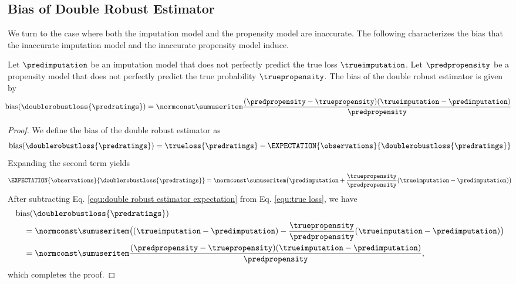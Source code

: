 \subsection{Bias of Double Robust Estimator}
We turn to the case where both the imputation model and the propensity model are inaccurate.
The following characterizes the bias that the inaccurate imputation model and the inaccurate propensity model induce.
\begin{lemma}
\label{lem:bias}
Let $\predimputation$ be an imputation model that does not perfectly predict the true loss $\trueimputation$.
Let $\predpropensity$ be a propensity model that does not perfectly predict the true probability $\truepropensity$.
The bias of the double robust estimator is given by
\begin{equation}
\hspace*{-0.16cm}
\text{bias}(\doublerobustloss{\predratings})
=
\normconst\sumuseritem
\frac{(\predpropensity-\truepropensity)(\trueimputation-\predimputation)}{\predpropensity}
\end{equation}%
\end{lemma}%
\begin{proof}
We define the bias of the double robust estimator as
\begin{equation}
\text{bias}(\doublerobustloss{\predratings})
=
\trueloss{\predratings}
-
\EXPECTATION{\observations}{\doublerobustloss{\predratings}}
\end{equation}%
Expanding the second term yields
\begin{equation}
\label{equ:double robust estimator expectation}
\EXPECTATION{\observations}{\doublerobustloss{\predratings}}
=
\normconst\sumuseritem
\big(
\predimputation
+
\frac{\truepropensity}{\predpropensity}(\trueimputation-\predimputation)
\big)
\end{equation}%
After subtracting Eq. \ref{equ:double robust estimator expectation} from Eq. \ref{equ:true loss}, we have
\begin{equation}
\begin{aligned}
&\text{bias}(\doublerobustloss{\predratings})
\\
&\quad
=
\normconst\sumuseritem
\big(
(\trueimputation-\predimputation)
-
\frac{\truepropensity}{\predpropensity}(\trueimputation-\predimputation)
\big)
\\
&\quad
=
\normconst\sumuseritem
\frac{(\predpropensity-\truepropensity)(\trueimputation-\predimputation)}{\predpropensity}
\text{,}
\end{aligned}
\end{equation}%
which completes the proof.
\end{proof}

